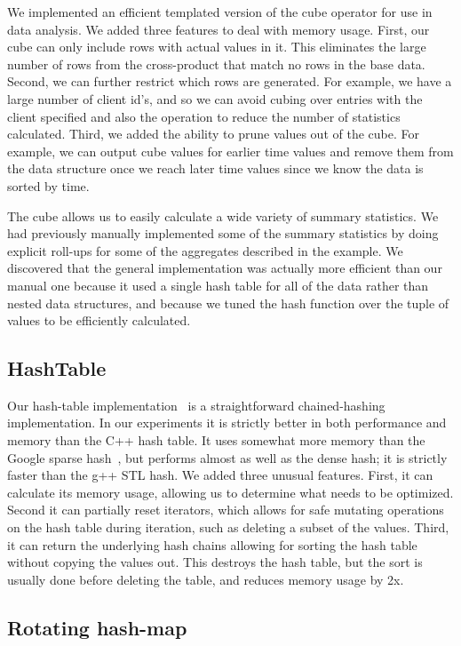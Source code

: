 We implemented an efficient templated version of the cube operator for
use in data analysis.  We added three features to deal with memory
usage.  First, our cube can only include rows with actual values in
it.  This eliminates the large number of rows from the cross-product
that match no rows in the base data.  Second, we can further restrict
which rows are generated.  For example, we have a large number of
client id's, and so we can avoid cubing over entries with the client
specified and also the operation to reduce the number of statistics
calculated.  Third, we added the ability to prune values out of the
cube. For example, we can output cube values for earlier time values
and remove them from the data structure once we reach later time
values since we know the data is sorted by time.

The cube allows us to easily calculate a wide variety of summary
statistics.  We had previously manually implemented some of the
summary statistics by doing explicit roll-ups for some of the
aggregates described in the example.  We discovered that the general
implementation was actually more efficient than our manual one because
it used a single hash table for all of the data rather than nested
data structures, and because we tuned the hash function over the tuple
of values to be efficiently calculated.

\subsection{HashTable}

Our hash-table implementation~\cite{DSOpenSource} is a straightforward
chained-hashing implementation.  In our experiments it is strictly
better in both performance and memory than the C++ hash table.  It
uses somewhat more memory than the Google sparse
hash~\cite{google-sparse-hash}, but performs almost as well as the
dense hash; it is strictly faster than the g++ STL hash.  We added
three unusual features.  First, it can calculate its memory usage,
allowing us to determine what needs to be optimized.  Second it can
partially reset iterators, which allows for safe mutating operations
on the hash table during iteration, such as deleting a subset of the
values.  Third, it can return the underlying hash chains allowing for
sorting the hash table without copying the values out.  This destroys
the hash table, but the sort is usually done before deleting the
table, and reduces memory usage by 2x.

\subsection{Rotating hash-map}

